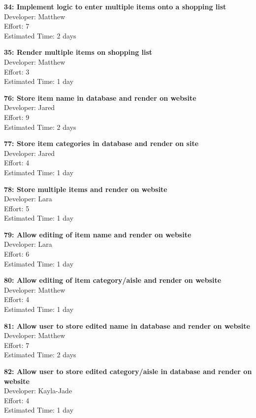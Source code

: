 \documentclass[10pt,onecolumn]{witseiepaper}
\begin{document}
\textbf{34: Implement logic to enter multiple items onto a shopping list} \\
Developer: Matthew\\
Effort: 7\\
Estimated Time: 2 days


\textbf{35: Render multiple items on shopping list} \\
Developer: Matthew\\
Effort: 3\\
Estimated Time: 1 day

\textbf{76: Store item name in database and render on website} \\
Developer: Jared\\
Effort: 9\\
Estimated Time: 2 days

\textbf{77: Store item categories in database and render on site} \\
Developer: Jared\\
Effort: 4\\
Estimated Time: 1 day

\textbf{78: Store multiple items and render on website} \\
Developer: Lara\\
Effort: 5\\
Estimated Time: 1 day

\textbf{79: Allow editing of item name and render on website} \\
Developer: Lara\\
Effort: 6\\
Estimated Time: 1 day

\textbf{80: Allow editing of item category/aisle and render on website} \\
Developer: Matthew\\
Effort: 4\\
Estimated Time: 1 day

\textbf{81: Allow user to store edited name in database and render on website} \\
Developer: Matthew\\
Effort: 7\\
Estimated Time: 2 days

\textbf{82: Allow user to store edited category/aisle in database and render on website} \\
Developer: Kayla-Jade\\
Effort: 4\\
Estimated Time: 1 day
\end{document}
